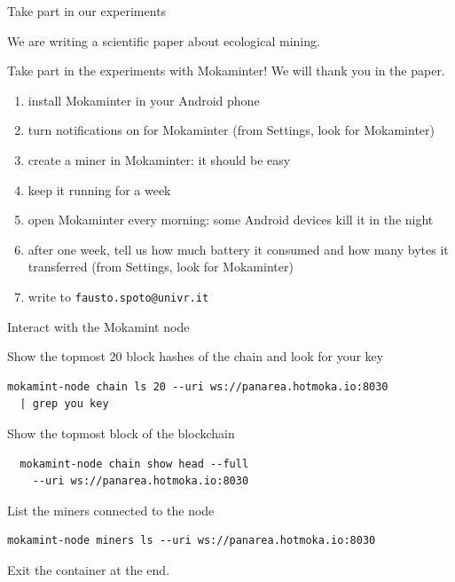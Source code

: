 \documentclass[11pt]{beamer}  %
\begin{document}
\begin{frame}[fragile]{Take part in our experiments}

  We are writing a scientific paper about ecological mining.

  Take part in the experiments with Mokaminter! We will thank you in the paper.

  \medskip

  \begin{enumerate}
  \item install Mokaminter in your Android phone
  \item turn notifications on for Mokaminter (from Settings, look for Mokaminter)
  \item create a miner in Mokaminter: it should be easy
  \item keep it running for a week
  \item open Mokaminter every morning: some Android devices kill it in the night
  \item after one week, tell us how much battery it consumed and how many bytes it transferred (from Settings, look for Mokaminter)
  \item write to \texttt{fausto.spoto@univr.it}
  \end{enumerate}

\end{frame}

\begin{frame}[fragile]{Interact with the Mokamint node}

  \begin{greenbox}{Show the topmost $20$ block hashes of the chain and look for your key}
\begin{verbatim}
mokamint-node chain ls 20 --uri ws://panarea.hotmoka.io:8030
  | grep you key
\end{verbatim}
  \end{greenbox}

  \bigskip\pause
  \begin{greenbox}{Show the topmost block of the blockchain}
\begin{verbatim}
  mokamint-node chain show head --full
    --uri ws://panarea.hotmoka.io:8030
\end{verbatim}
  \end{greenbox}

  \bigskip\pause
  \begin{greenbox}{List the miners connected to the node}
\begin{verbatim}
mokamint-node miners ls --uri ws://panarea.hotmoka.io:8030
\end{verbatim}
  \end{greenbox}

\bigskip
  Exit the container at the end.
  
\end{frame}
\end{document}
